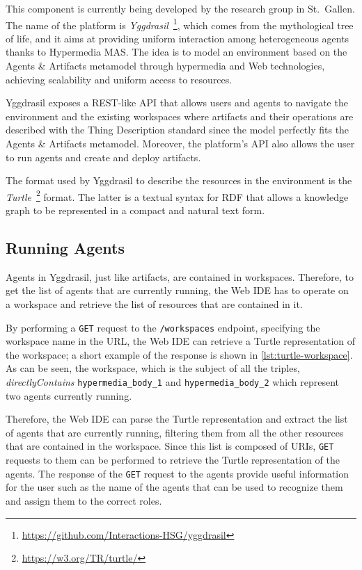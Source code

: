 This component is currently being developed by the research group in St.\ Gallen.
The name of the platform is \textit{Yggdrasil}~\footnote{\url{https://github.com/Interactions-HSG/yggdrasil}}, which comes from the mythological tree of life, and it aims at providing uniform interaction among heterogeneous agents thanks to Hypermedia MAS.
The idea is to model an environment based on the Agents \& Artifacts metamodel through hypermedia and Web technologies, achieving scalability and uniform access to resources.

Yggdrasil exposes a REST-like API that allows users and agents to navigate the environment and the existing workspaces where artifacts and their operations are described with the Thing Description standard since the model perfectly fits the Agents \& Artifacts metamodel.
Moreover, the platform's API also allows the user to run agents and create and deploy artifacts.

The format used by Yggdrasil to describe the resources in the environment is the \textit{Turtle}~\footnote{\url{https://w3.org/TR/turtle/}} format.
The latter is a textual syntax for RDF that allows a knowledge graph to be represented in a compact and natural text form.

\subsection{Running Agents}
Agents in Yggdrasil, just like artifacts, are contained in workspaces.
Therefore, to get the list of agents that are currently running, the Web IDE has to operate on a workspace and retrieve the list of resources that are contained in it.

By performing a \texttt{GET} request to the \texttt{/workspaces} endpoint, specifying the workspace name in the URL, the Web IDE can retrieve a Turtle representation of the workspace; a short example of the response is shown in \cref{lst:turtle-workspace}.
As can be seen, the workspace, which is the subject of all the triples, \textit{directlyContains} \texttt{hypermedia\_body\_1} and \texttt{hypermedia\_body\_2} which represent two agents currently running.

\begin{figure}
    
\end{figure}

Therefore, the Web IDE can parse the Turtle representation and extract the list of agents that are currently running, filtering them from all the other resources that are contained in the workspace.
Since this list is composed of URIs, \texttt{GET} requests to them can be performed to retrieve the Turtle representation of the agents.
The response of the \texttt{GET} request to the agents provide useful information for the user such as the name of the agents that can be used to recognize them and assign them to the correct roles.


